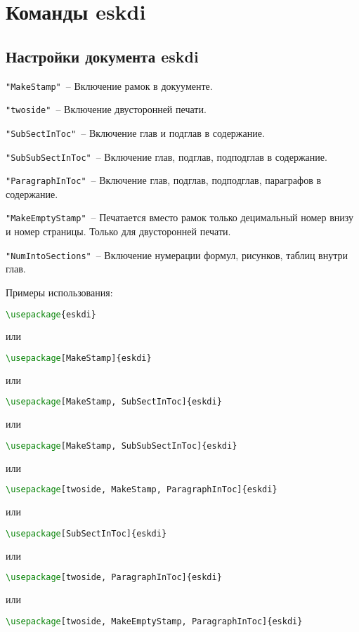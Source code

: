 \section{Команды eskdi}


\subsection{Настройки документа eskdi}

\noindent \verb|"MakeStamp"|~– Включение рамок в докуументе.

\noindent \verb|"twoside"|~– Включение двусторонней печати.

\noindent \verb|"SubSectInToc"|~– Включение глав и подглав в содержание.

\noindent \verb|"SubSubSectInToc"|~– Включение глав, подглав, подподглав в содержание.

\noindent \verb|"ParagraphInToc"|~– Включение глав, подглав, подподглав, параграфов в содержание.

\noindent \verb|"MakeEmptyStamp"|~– Печатается вместо рамок только децимальный номер внизу и номер страницы. Только для двусторонней печати.

\noindent \verb|"NumIntoSections"|~–  Включение нумерации формул, рисунков, таблиц внутри глав.



Примеры использования:
\begin{lstlisting}[language=TeX, style=FrameStyle]
\usepackage{eskdi}
\end{lstlisting}
или
\begin{lstlisting}[language=TeX, style=FrameStyle]
\usepackage[MakeStamp]{eskdi}
\end{lstlisting}
или
\begin{lstlisting}[language=TeX, style=FrameStyle]
\usepackage[MakeStamp, SubSectInToc]{eskdi}
\end{lstlisting}
или
\begin{lstlisting}[language=TeX, style=FrameStyle]
\usepackage[MakeStamp, SubSubSectInToc]{eskdi}
\end{lstlisting}
или
\begin{lstlisting}[language=TeX, style=FrameStyle]
\usepackage[twoside, MakeStamp, ParagraphInToc]{eskdi}
\end{lstlisting}
или
\begin{lstlisting}[language=TeX, style=FrameStyle]
\usepackage[SubSectInToc]{eskdi}
\end{lstlisting}
или
\begin{lstlisting}[language=TeX, style=FrameStyle]
\usepackage[twoside, ParagraphInToc]{eskdi}
\end{lstlisting}
или
\begin{lstlisting}[language=TeX, style=FrameStyle]
\usepackage[twoside, MakeEmptyStamp, ParagraphInToc]{eskdi}
\end{lstlisting}


